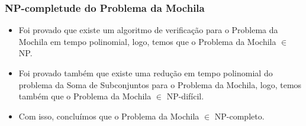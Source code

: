 \documentclass{beamer}
\begin{document}
\begin{frame}
\frametitle{NP-completude do Problema da Mochila}
    \begin{itemize}
        \item Foi provado que existe um algoritmo de verificação para o Problema da Mochila em tempo polinomial, logo, temos que o Problema da Mochila $\in$ NP.
        \item Foi provado também que existe uma redução em tempo polinomial do problema da Soma de Subconjuntos para o Problema da Mochila, logo, temos também que o Problema da Mochila $\in$ NP-difícil.
        \item Com isso, concluímos que o Problema da Mochila $\in$ NP-completo.
    \end{itemize}
\end{frame}
\end{document}
